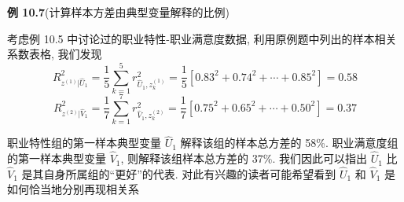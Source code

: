 \noindent\textbf{例 10.7}\quad (计算样本方差由典型变量解释的比例)

考虑例 10.5 中讨论过的职业特性-职业满意度数据, 利用原例题中列出的样本相关系数表格, 我们发现
\[
R^2_{z^{(1)}|\hat{U}_1}=\frac{1}{5}\sum_{k=1}^{5}r^2_{\hat{U}_1,z_k^{(1)}}=\frac{1}{5}[0.83^2+0.74^2+\cdots+0.85^2]=0.58
\]
\[
R^2_{z^{(2)}|\hat{V}_1}=\frac{1}{7}\sum_{k=1}^{7}r^2_{\hat{V}_1,z_k^{(2)}}=\frac{1}{7}[0.75^2+0.65^2+\cdots+0.50^2]=0.37
\]

职业特性组的第一样本典型变量 $\hat{U}_1$ 解释该组的样本总方差的 58\%. 职业满意度组的第一样本典型变量 $\hat{V}_1$, 则解释该组样本总方差的 37\%. 我们因此可以指出 $\hat{U}_1$ 比 $\hat{V}_1$ 是其自身所属组的“更好”的代表. 对此有兴趣的读者可能希望看到 $\hat{U}_1$ 和 $\hat{V}_1$ 是如何恰当地分别再现相关系
